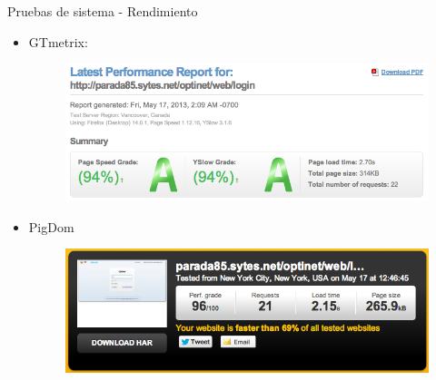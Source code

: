 \documentclass[spanish,xcolor=table,svgnames]{beamer}
\begin{document}
\begin{frame}{Pruebas de sistema - Rendimiento}
\begin{itemize}
\item GTmetrix:
  \begin{figure}[]
\includegraphics[scale=0.3]{ren}
\end{figure}

\item PigDom
  \begin{figure}[]
\includegraphics[scale=0.3]{renotro}
\end{figure}
\end{itemize}
\end{frame}
\end{document}
